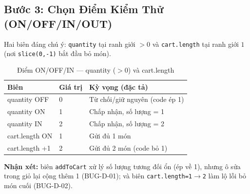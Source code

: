 \documentclass[12pt, a4paper]{report}
\begin{document}
\subsection{Bước 3: Chọn Điểm Kiểm Thử (ON/OFF/IN/OUT)}
Hai biên đáng chú ý: \texttt{quantity} tại ranh giới $>0$ và \texttt{cart.length} tại ranh giới
$1$ (nơi \texttt{slice(0,-1)} bắt đầu bỏ món).

\begin{table}[H]
    \centering
    \caption{Điểm ON/OFF/IN — quantity ($>0$) và cart.length}
    \begin{tabularx}{\linewidth}{L{3.4cm} C{2cm} X}
        \toprule
        \textbf{Biên} & \textbf{Giá trị} & \textbf{Kỳ vọng (đặc tả)} \\
        \midrule
        quantity OFF   & 0 & Từ chối/giữ nguyên (code ép 1) \\
        quantity ON    & 1 & Chấp nhận, số lượng = 1 \\
        quantity IN    & 2 & Chấp nhận, số lượng = 2 \\
        cart.length ON & 1 & Gửi đủ 1 món \\
        cart.length +1 & 2 & Gửi đủ 2 món (code bỏ 1) \\
        \bottomrule
    \end{tabularx}
\end{table}

\noindent\textbf{Nhận xét:} biên \texttt{addToCart} xử lý số lượng tương đối ổn (ép về 1),
nhưng ô sửa trong giỏ lại cộng thêm 1 (BUG-D-01); và biên \texttt{cart.length=1$\to$2}
làm lộ lỗi bỏ món cuối (BUG-D-02).
\end{document}
